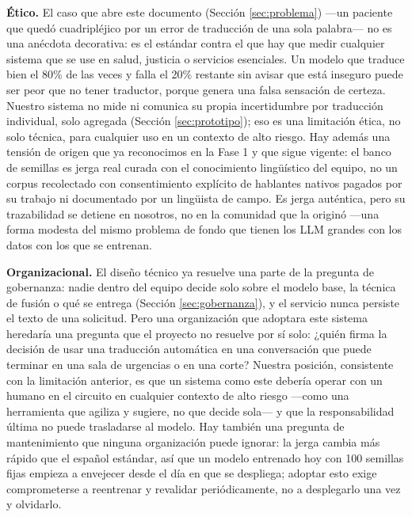 \documentclass[11pt,a4paper]{article}
\begin{document}
\textbf{Ético.} El caso que abre este documento (Sección \ref{sec:problema}) —un paciente que quedó cuadripléjico por un error de traducción de una sola palabra— no es una anécdota decorativa: es el estándar contra el que hay que medir cualquier sistema que se use en salud, justicia o servicios esenciales. Un modelo que traduce bien el 80\% de las veces y falla el 20\% restante sin avisar que está inseguro puede ser peor que no tener traductor, porque genera una falsa sensación de certeza. Nuestro sistema no mide ni comunica su propia incertidumbre por traducción individual, solo agregada (Sección \ref{sec:prototipo}); eso es una limitación ética, no solo técnica, para cualquier uso en un contexto de alto riesgo. Hay además una tensión de origen que ya reconocimos en la Fase 1 y que sigue vigente: el banco de semillas es jerga real curada con el conocimiento lingüístico del equipo, no un corpus recolectado con consentimiento explícito de hablantes nativos pagados por su trabajo ni documentado por un lingüista de campo. Es jerga auténtica, pero su trazabilidad se detiene en nosotros, no en la comunidad que la originó —una forma modesta del mismo problema de fondo que tienen los LLM grandes con los datos con los que se entrenan.

\textbf{Organizacional.} El diseño técnico ya resuelve una parte de la pregunta de gobernanza: nadie dentro del equipo decide solo sobre el modelo base, la técnica de fusión o qué se entrega (Sección \ref{sec:gobernanza}), y el servicio nunca persiste el texto de una solicitud. Pero una organización que adoptara este sistema heredaría una pregunta que el proyecto no resuelve por sí solo: ¿quién firma la decisión de usar una traducción automática en una conversación que puede terminar en una sala de urgencias o en una corte? Nuestra posición, consistente con la limitación anterior, es que un sistema como este debería operar con un humano en el circuito en cualquier contexto de alto riesgo —como una herramienta que agiliza y sugiere, no que decide sola— y que la responsabilidad última no puede trasladarse al modelo. Hay también una pregunta de mantenimiento que ninguna organización puede ignorar: la jerga cambia más rápido que el español estándar, así que un modelo entrenado hoy con 100 semillas fijas empieza a envejecer desde el día en que se despliega; adoptar esto exige comprometerse a reentrenar y revalidar periódicamente, no a desplegarlo una vez y olvidarlo.
\end{document}
